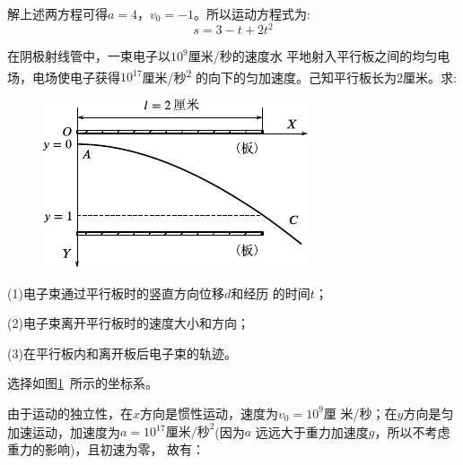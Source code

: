 解上述两方程可得$a=4$，$v_0=-1$。所以运动方程式为:
\begin{equation*}
  s=3-t+2t^2
\end{equation*}

\example 在阴极射线管中，一束电子以$10^9$厘米/秒的速度水
平地射入平行板之间的均匀电场，电场使电子获得$10^{17}$厘米/秒\textsuperscript{2}
的向下的匀加速度。己知平行板长为2厘米。求:

\begin{figure}
  \centering
  \includegraphics{figure/fig01.15}
  \caption{}
  \label{fig:01.15}
\end{figure}
(1)电子束通过平行板时的竖直方向位移$d$和经历
的时间$t$；

(2)电子束离开平行板时的速度大小和方向；

(3)在平行板内和离开板后电子束的轨迹。

\solution 选择如图\ref{fig:01.15}~所示的坐标系。

由于运动的独立性，在$x$方向是惯性运动，速度为$v_0=10^9$厘
米/秒；在$y$方向是匀加速运动，加速度为$a=10^{17}\text{厘米/秒}^2$(因为$a$
远远大于重力加速度$g$，所以不考虑重力的影响)，且初速为零，
故有：

